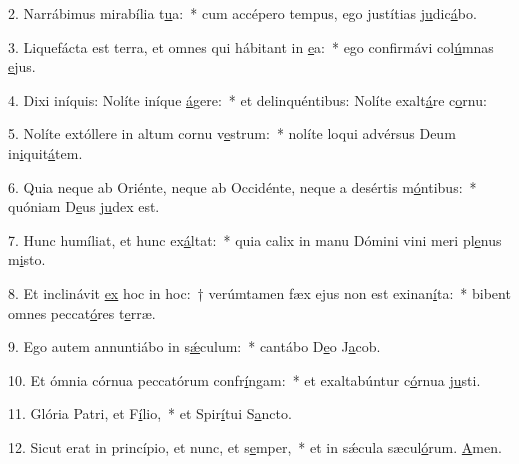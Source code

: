 2. Narrábimus mirabília t\uline{u}a:~* cum accépero tempus, ego justítias j\uline{u}dic\uline{á}bo.\par 
3. Liquefácta est terra, et omnes qui hábitant in \uline{e}a:~* ego confirmávi col\uline{ú}mnas \uline{e}jus.\par 
4. Dixi iníquis: Nolíte iníque \uline{á}gere:~* et delinquéntibus: Nolíte exalt\uline{á}re c\uline{o}rnu:\par 
5. Nolíte extóllere in altum cornu v\uline{e}strum:~* nolíte loqui advérsus Deum in\uline{i}quit\uline{á}tem.\par 
6. Quia neque ab Oriénte, neque ab Occidénte, neque a desértis m\uline{ó}ntibus:~* quóniam D\uline{e}us j\uline{u}dex est.\par 
7. Hunc humíliat, et hunc ex\uline{á}ltat:~* quia calix in manu Dómini vini meri pl\uline{e}nus m\uline{i}sto.\par 
8. Et inclinávit \uline{ex} hoc in hoc:~† verúmtamen fæx ejus non est exinan\uline{í}ta:~* bibent omnes peccat\uline{ó}res t\uline{e}rræ.\par 
9. Ego autem annuntiábo in s\uline{ǽ}culum:~* cantábo D\uline{e}o J\uline{a}cob.\par 
10. Et ómnia córnua peccatórum confr\uline{í}ngam:~* et exaltabúntur c\uline{ó}rnua j\uline{u}sti.\par 
11. Glória Patri, et F\uline{í}lio,~* et Spir\uline{í}tui S\uline{a}ncto.\par 
12. Sicut erat in princípio, et nunc, et s\uline{e}mper,~* et in sǽcula sæcul\uline{ó}rum. \uline{A}men.\par 
